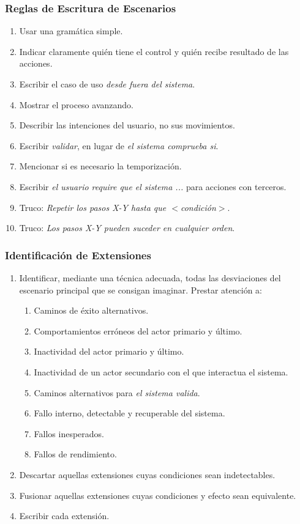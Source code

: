 \documentclass[slidestop,xcolor=pst,dvips,blue]{beamer}
\begin{document}
\begin{frame}[c]
    \frametitle{Reglas de Escritura de Escenarios}
    \begin{enumerate}[<+->]
        \item Usar una gramática simple.
        \item Indicar claramente quién tiene el control y quién recibe resultado de las acciones.
        \item Escribir el caso de uso \emph{desde fuera del sistema}.
        \item Mostrar el proceso avanzando.
        \item Describir las intenciones del usuario, no sus movimientos.
        \item Escribir \emph{validar}, en lugar de \emph{el sistema comprueba si}.
        \item Mencionar si es necesario la temporización.
        \item Escribir \emph{el usuario require que el sistema ...} para acciones con terceros.
        \item Truco: \emph{Repetir los pasos X-Y hasta que $<$condición$>$}.
        \item Truco: \emph{Los pasos X-Y pueden suceder en cualquier orden}.
    \end{enumerate}
\end{frame}

\begin{frame}[c]
    \frametitle{Identificación de Extensiones}
    \begin{enumerate}[<+->]
        \item Identificar, mediante una técnica adecuada, todas las desviaciones del escenario principal que se consigan imaginar. Prestar atención a:
            \begin{enumerate}
                \item Caminos de éxito alternativos.
                \item Comportamientos erróneos del actor primario y último.
                \item Inactividad del actor primario y último.
                \item Inactividad de un actor secundario con el que interactua el sistema.
                \item Caminos alternativos para \emph{el sistema valida}.
                \item Fallo interno, detectable y recuperable del sistema.
                \item Fallos inesperados.
                \item Fallos de rendimiento.
            \end{enumerate}
        \item Descartar aquellas extensiones cuyas condiciones sean indetectables.
        \item Fusionar aquellas extensiones cuyas condiciones y efecto sean equivalente.
        \item Escribir cada extensión.
    \end{enumerate}
\end{frame}
\end{document}
